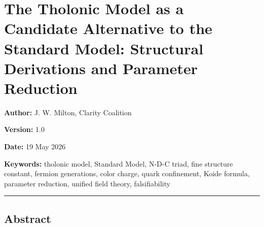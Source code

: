 \documentclass[
  11pt,
  letterpaper,
]{article}
\author{}
\date{}
\begin{document}
\section{The Tholonic Model as a Candidate Alternative to the Standard
Model: Structural Derivations and Parameter
Reduction}\label{the-tholonic-model-as-a-candidate-alternative-to-the-standard-model-structural-derivations-and-parameter-reduction}

\textbf{Author:} J. W. Milton, Clarity Coalition

\textbf{Version:} 1.0

\textbf{Date:} 19 May 2026

\textbf{Keywords:} tholonic model, Standard Model, N-D-C triad, fine
structure constant, fermion generations, color charge, quark
confinement, Koide formula, parameter reduction, unified field theory,
falsifiability

\begin{center}\rule{0.5\linewidth}{0.5pt}\end{center}

\subsection{Abstract}\label{abstract}
\end{document}
